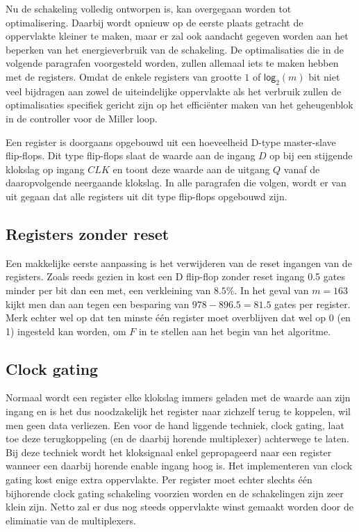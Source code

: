 Nu de schakeling volledig ontworpen is, kan overgegaan worden tot optimalisering. Daarbij wordt opnieuw op de eerste plaats getracht de oppervlakte kleiner te maken, maar er zal ook aandacht gegeven worden aan het beperken van het energieverbruik van de schakeling. De optimalisaties die in de volgende paragrafen voorgesteld worden, zullen allemaal iets te maken hebben met de registers. Omdat de enkele registers van grootte $1$ of $\textsf{log}_2(m)$ bit niet veel bijdragen aan zowel de uiteindelijke oppervlakte als het verbruik zullen de optimalisaties specifiek gericht zijn op het effici\"enter maken van het geheugenblok in de controller voor de Miller loop.

Een register is doorgaans opgebouwd uit een hoeveelheid D-type master-slave flip-flops. Dit type flip-flops slaat de waarde aan de ingang $D$ op bij een stijgende klokslag op ingang $CLK$ en toont deze waarde aan de uitgang $Q$ vanaf de daaropvolgende neergaande klokslag. In alle paragrafen die volgen, wordt er van uit gegaan dat alle registers uit dit type flip-flops opgebouwd zijn.

\subsection{Registers zonder reset}

Een makkelijke eerste aanpassing is het verwijderen van de reset ingangen van de registers. Zoals reeds gezien in  kost een D flip-flop zonder reset ingang 0.5 gates minder per bit dan een met, een verkleining van $8.5\%$. In het geval van $m = 163$ kijkt men dan aan tegen een besparing van $978 - 896.5 = 81.5$ gates per register. Merk echter wel op dat ten minste \'e\'en register moet overblijven dat wel op 0 (en 1) ingesteld kan worden, om $F$ in te stellen aan het begin van het algoritme.

\subsection{Clock gating}


Normaal wordt een register elke klokslag immers geladen met de waarde aan zijn ingang en is het dus noodzakelijk het register naar zichzelf terug te koppelen, wil men geen data verliezen. Een voor de hand liggende techniek, clock gating, laat toe deze terugkoppeling (en de daarbij horende multiplexer) achterwege te laten. Bij deze techniek wordt het kloksignaal enkel gepropageerd naar een register wanneer een daarbij horende enable ingang hoog is. Het implementeren van clock gating kost enige extra oppervlakte. Per register moet echter slechts \'e\'en bijhorende clock gating schakeling voorzien  worden en de schakelingen zijn zeer klein zijn. Netto zal er dus nog steeds oppervlakte winst gemaakt worden door de eliminatie van de multiplexers.

